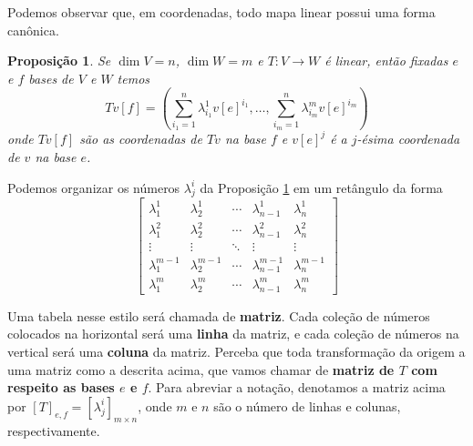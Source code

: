 \documentclass{article}
\newtheorem{proposition}[definition]{Proposição}
\begin{document}
Podemos observar que, em coordenadas, todo mapa linear possui uma forma canônica.

\begin{proposition}\label{prop17}
    Se $\dim V = n$, $\dim W = m$ e $T \colon V \to W$ é linear, então fixadas $e$ e $f$ bases de $V$ e $W$ temos \begin{equation}
        Tv[f] = \left(\sum_{i_1 = 1}^n \lambda^1_{i_1} v[e]^{i_1}, \dots, \sum_{i_m = 1}^n \lambda^m_{i_m} v[e]^{i_m}\right)
    \end{equation} onde $Tv[f]$ são as coordenadas de $Tv$ na base $f$ e $v[e]^j$ é a $j$-ésima coordenada de $v$ na base $e$.
\end{proposition}

Podemos organizar os números $\lambda^i_j$ da Proposição \ref{prop17} em um retângulo da forma \begin{equation}
    \begin{bmatrix}
        \lambda^1_1 & \lambda^1_2 & \cdots & \lambda^1_{n-1} & \lambda^1_n \\ \lambda^2_1 & \lambda^2_2 & \cdots & \lambda^2_{n-1} & \lambda^2_n \\ \vdots & \vdots & \ddots & \vdots & \vdots \\ \lambda^{m-1}_1 & \lambda^{m-1}_2 & \cdots & \lambda^{m-1}_{n-1} & \lambda^{m-1}_n \\  \lambda^m_1 & \lambda^m_2 & \cdots & \lambda^m_{n-1} & \lambda^m_n
    \end{bmatrix}
\end{equation}

Uma tabela nesse estilo será chamada de \textbf{matriz}. Cada coleção de números colocados na horizontal será uma \textbf{linha} da matriz, e cada coleção de números na vertical será uma \textbf{coluna} da matriz. Perceba que toda transformação da origem a uma matriz como a descrita acima, que vamos chamar de \textbf{matriz de $T$ com respeito as bases $e$ e $f$}. Para abreviar a notação, denotamos a matriz acima por $[T]_{e, f} = [\lambda^i_j]_{m \times n}$, onde $m$ e $n$ são o número de linhas e colunas, respectivamente.
\end{document}
